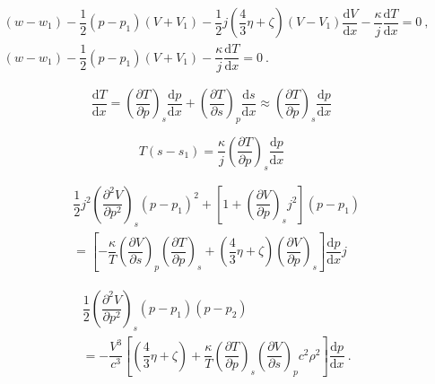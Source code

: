 \documentclass[12pt,a4paper]{article}
\newcommand{\dif}{\mathrm{d}}
\begin{document}
\begin{align*}
& (w-w_1) -\dfrac{1}{2}(p-p_1)(V+V_1) - \dfrac{1}{2} j \left(\dfrac{4}{3} \eta +\zeta \right) (V-V_1) \dfrac{\dif V}{\dif x} -\dfrac{\kappa}{j} \dfrac{\dif T}{\dif x} = 0 ~, \\
& (w-w_1) -\dfrac{1}{2}(p-p_1)(V+V_1) -\dfrac{\kappa}{j} \dfrac{\dif T}{\dif x} = 0 ~.
\end{align*}

\begin{equation}
\dfrac{\dif T}{\dif x} = \left(\dfrac{\partial T}{\partial p}\right)_s \dfrac{\dif p}{\dif x} + \left(\dfrac{\partial T}{\partial s}\right)_p \dfrac{\dif s}{\dif x} \approx \left(\dfrac{\partial T}{\partial p}\right)_s \dfrac{\dif p}{\dif x}  
\end{equation}

\begin{equation}
T(s-s_1) = \dfrac{\kappa}{j} \left(\dfrac{\partial T}{\partial p}\right)_s \dfrac{\dif p}{\dif x}
\end{equation}

\begin{align*}
& \dfrac{1}{2} j^2 \left(\dfrac{\partial^2 V}{\partial p^2}\right)_s (p-p_1)^2 + \left[1 +\left(\dfrac{\partial V}{\partial p}\right)_s j^2 \right](p-p_1) \\
&= \left[-\dfrac{\kappa}{T} \left(\dfrac{\partial V}{\partial s}\right)_p  \left(\dfrac{\partial T}{\partial p}\right)_s +\left(\dfrac{4}{3} \eta +\zeta \right)  \left(\dfrac{\partial V}{\partial p}\right)_s \right]  \dfrac{\dif p}{\dif x} j
\end{align*}

\begin{align*}
& \dfrac{1}{2} \left(\dfrac{\partial^2 V}{\partial p^2}\right)_s (p-p_1)(p-p_2) \\
&= -\dfrac{V^3}{c^3} \left[\left(\dfrac{4}{3} \eta +\zeta \right) +\dfrac{\kappa}{T}  \left(\dfrac{\partial T}{\partial p}\right)_s \left(\dfrac{\partial V}{\partial s}\right)_p c^2 \rho^2 \right] \dfrac{\dif p}{\dif x} ~. 
\end{align*}
\end{document}
